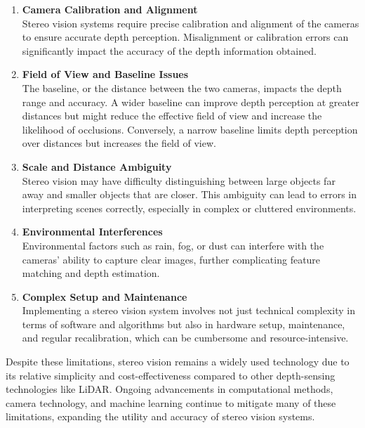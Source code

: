 \documentclass[22pt]{report}
\begin{document}
\begin{enumerate}
            \item \textbf{Camera Calibration and Alignment}\\
                Stereo vision systems require precise calibration and alignment of the cameras to ensure accurate depth perception. Misalignment or calibration errors can significantly impact the accuracy of the depth information obtained.
            \item \textbf{Field of View and Baseline Issues}\\
                The baseline, or the distance between the two cameras, impacts the depth range and accuracy. A wider baseline can improve depth perception at greater distances but might reduce the effective field of view and increase the likelihood of occlusions. Conversely, a narrow baseline limits depth perception over distances but increases the field of view.
            \item \textbf{Scale and Distance Ambiguity}\\
                Stereo vision may have difficulty distinguishing between large objects far away and smaller objects that are closer. This ambiguity can lead to errors in interpreting scenes correctly, especially in complex or cluttered environments.
            \item \textbf{Environmental Interferences}\\
                Environmental factors such as rain, fog, or dust can interfere with the cameras' ability to capture clear images, further complicating feature matching and depth estimation.
            \item \textbf{Complex Setup and Maintenance}\\
                Implementing a stereo vision system involves not just technical complexity in terms of software and algorithms but also in hardware setup, maintenance, and regular recalibration, which can be cumbersome and resource-intensive.
        \end{enumerate}
        Despite these limitations, stereo vision remains a widely used technology due to its relative simplicity and cost-effectiveness compared to other depth-sensing technologies like LiDAR. Ongoing advancements in computational methods, camera technology, and machine learning continue to mitigate many of these limitations, expanding the utility and accuracy of stereo vision systems.

\end{document}
